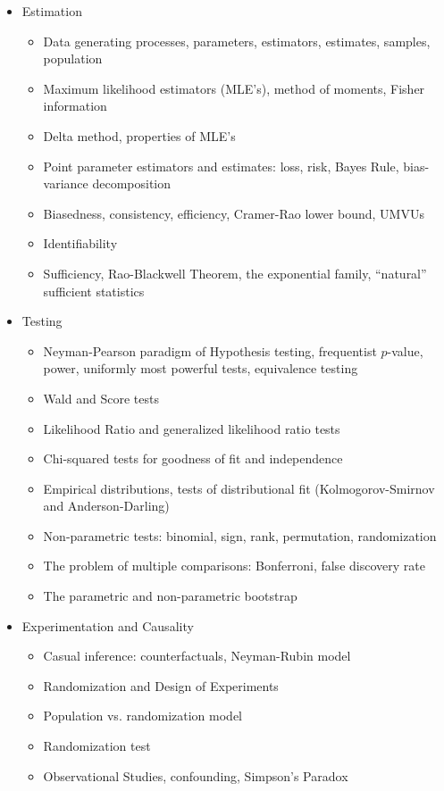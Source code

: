 \documentclass[12pt]{article}
\newcommand{\qu}[1]{``#1''}
\begin{document}
\begin{itemize}
\itemsep -0.0em 
\item Estimation
\begin{itemize}
\item Data generating processes, parameters, estimators, estimates, samples, population 
\item Maximum likelihood estimators (MLE's), method of moments, Fisher information
\item Delta method, properties of MLE's
\item Point parameter estimators and estimates: loss, risk, Bayes Rule, bias-variance decomposition
\item Biasedness, consistency, efficiency, Cramer-Rao lower bound, UMVUs
\item Identifiability
\item Sufficiency, Rao-Blackwell Theorem, the exponential family, \qu{natural} sufficient statistics
\end{itemize}
\item Testing
\begin{itemize}
\item Neyman-Pearson paradigm of Hypothesis testing, frequentist $p$-value, power, uniformly most powerful tests, equivalence testing
\item Wald and Score tests
\item Likelihood Ratio and generalized likelihood ratio tests
\item Chi-squared tests for goodness of fit and independence
\item Empirical distributions, tests of distributional fit (Kolmogorov-Smirnov and Anderson-Darling)
\item Non-parametric tests: binomial, sign, rank, permutation, randomization
\item The problem of multiple comparisons: Bonferroni, false discovery rate
\item The parametric and non-parametric bootstrap
\end{itemize}
\item Experimentation and Causality
\begin{itemize}
\item Casual inference: counterfactuals, Neyman-Rubin model
\item Randomization and Design of Experiments
\item Population vs. randomization model
\item Randomization test
\item Observational Studies, confounding, Simpson's Paradox
\end{itemize}
\end{itemize}
\end{document}
